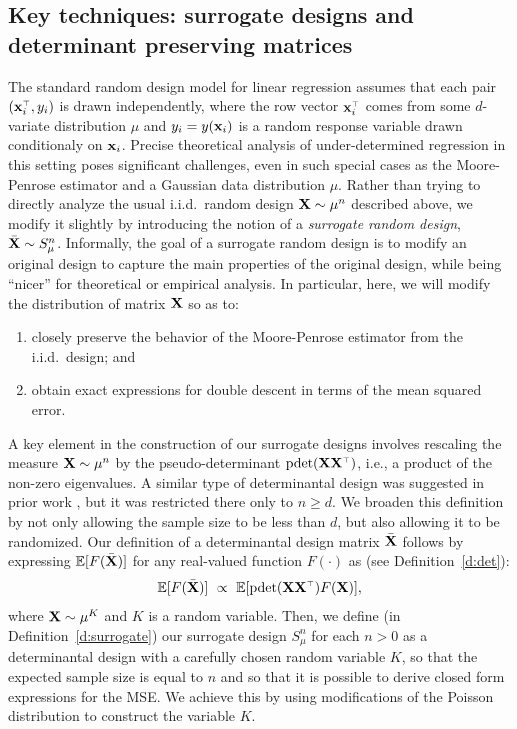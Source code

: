 \documentclass[11pt]{article}
\begin{document}
\subsection{Key techniques: surrogate designs and
  determinant preserving matrices}

The standard random design model for linear regression assumes that
each pair $(\x_i^\top,y_i)$ is drawn independently, where the row vector
$\x_i^\top$ comes from some $d$-variate distribution $\mu$ and $y_i=y(\mathbf x_i)$ is a random response variable drawn conditionaly on $\mathbf x_i$.
Precise theoretical analysis of under-determined regression in this
setting poses significant challenges, even in such special cases as
the Moore-Penrose estimator and a Gaussian data distribution $\mu$.  
Rather than trying to directly analyze the usual i.i.d.~random design
$\mathbf X\sim\mu^n$ described above, we modify it slightly by introducing
the notion of a \emph{surrogate random design}, ${\bar{\mathbf X}}\sim S_\mu^n$.  
Informally, the goal of a surrogate random design is to modify an
original design to capture the main properties of the original design,
while being ``nicer'' for theoretical or empirical analysis. 
In particular, here, we will modify the distribution of matrix $\mathbf X$ so
as to: 
\begin{enumerate}
  \item closely preserve the behavior of the Moore-Penrose estimator
from the i.i.d.~design; and
  \item obtain exact expressions for double descent in terms of the
    mean squared error.
\end{enumerate}
A key element in the construction of our surrogate designs involves rescaling the measure $\mathbf X\sim\mu^n$ by the pseudo-determinant $\pdet(\X\X^\top)$, i.e., a product of the non-zero eigenvalues. 
A similar type of determinantal design was suggested in prior work
\cite{correcting-bias-journal}, but it was restricted there only to
$n\geq d$.  
We broaden this definition by not only allowing the sample size to be
less than $d$, but also allowing it to be randomized.  
Our definition of a determinantal design matrix ${\bar{\mathbf X}}$ follows by
expressing $\mathbb E[F({\bar{\mathbf X}})]$ for any real-valued function $F(\cdot)$ as
(see Definition~\ref{d:det}):  
\begin{align*}
  \E[F(\Xb)]\ \propto\ \E[\pdet(\X\X^\top)F(\X)],
  \end{align*}
where $\mathbf X\sim\mu^K$ and $K$ is a random variable.
Then, we define (in Definition~\ref{d:surrogate}) our surrogate design $S_\mu^n$ for each $n>0$ as a determinantal design with a carefully chosen random variable $K$, so that the expected sample size is equal to $n$ and so that it is possible to derive closed form expressions for the MSE. 
We achieve this by using modifications of the Poisson distribution to construct the variable $K$. 
\end{document}
